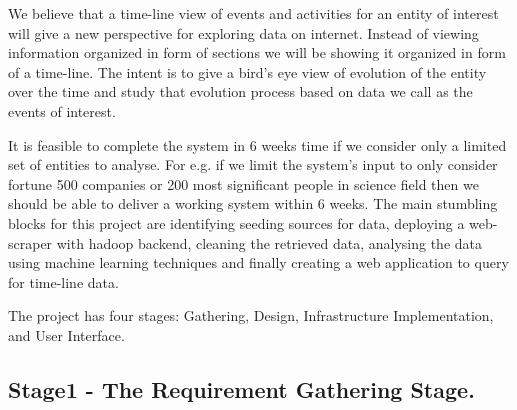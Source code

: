 \documentclass[10pt,conference]{IEEEtran}
\begin{document}
We believe that a time-line view of events and activities for an entity of
interest will give a new perspective for exploring data on internet. Instead of
viewing information organized in form of sections we will be showing it
organized in form of a time-line. The intent is to give a bird's eye view of
evolution of the entity over the time and study that evolution process based on
data we call as the events of interest.

It is feasible to complete the system in 6 weeks time if we consider only a
limited set of entities to analyse. For e.g. if we limit the system's input to
only consider fortune 500 companies or 200 most significant people in science
field then we should be able to deliver a working system within 6 weeks. The
main stumbling blocks for this project are identifying seeding sources for
data, deploying a web-scraper with hadoop backend, cleaning the retrieved data,
analysing the data using machine learning techniques and finally creating a web
application to query for time-line data.

The project has four stages: Gathering, Design, Infrastructure Implementation,
and User Interface.

\subsection{Stage1 - The Requirement Gathering Stage. }\label{sec:1 Requirement Gathering Stage. }


%

%

%

%



%
%
\end{document}

